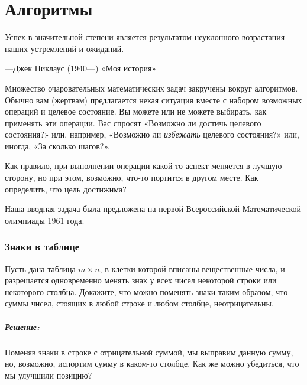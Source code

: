 \chapter*{Алгоритмы}


\setlength{\epigraphwidth}{.8\textwidth}
\epigraph{Успех в значительной степени является результатом неуклонного возрастания наших устремлений и ожиданий.}{---Джек Никлаус (1940---) «Моя история»}



Множество очаровательных математических задач закручены вокруг алгоритмов.
Обычно вам (жертвам) предлагается некая ситуация вместе с набором возможных операций и целевое состояние.
Вы можете или не можете выбирать, как применять эти операции.
Вас спросят «Возможно ли достичь целевого состояния?» или, например, «Возможно ли \emph{избежать} целевого состояния?» или, иногда, «За сколько шагов?».

Как правило, при выполнении операции какой-то аспект меняется в лучшую сторону, но при этом, возможно, что-то портится в другом месте.
Как определить, что цель достижима?

Наша вводная задача была предложена на первой Всероссийской Математической олимпиады 1961 года.

\subsection*{Знаки в таблице}%

Пусть дана таблица $m\times n$, в клетки которой вписаны вещественные числа, и разрешается одновременно менять знак у всех чисел некоторой строки или некоторого столбца.
Докажите, что можно поменять знаки таким образом, что суммы чисел, стоящих в любой строке и любом столбце, неотрицательны.

\paragraph{Решение:}
Поменяв знаки в строке с отрицательной суммой, мы выправим данную сумму, но, возможно, испортим сумму в каком-то столбце.
Как же можно убедиться, что мы улучшили позицию?

